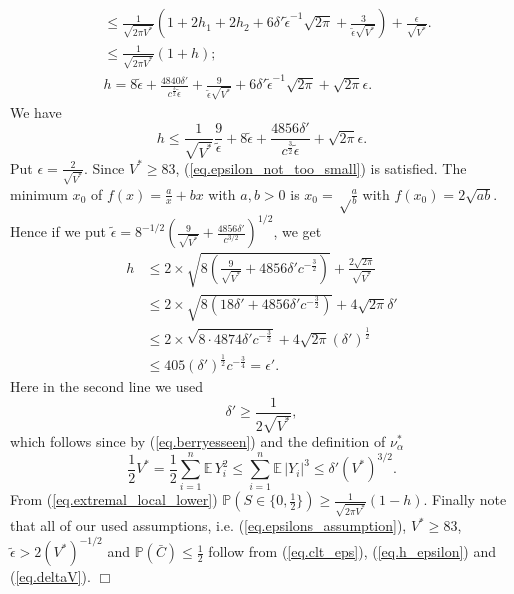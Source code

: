 \documentclass{article}
\newenvironment{proofof}[1]{\noindent {\bf Proof of #1}}{\hspace*{\fill}$\Box$}
\def\E{{\mathbb E}\,}
\newcommand{\pr}{\mathbb P}
\newcommand\nuopt[1]{\nu_{#1}^*}
\begin{document}
\begin{proofof}{Lemma~\ref{lem.clt}}
\begin{align*}
        \\ &
\le
         \frac 1 {\sqrt {2 \pi V^*}} (1 +  2h_1 + 2h_2 +   {6 \delta'} {\tilde{\epsilon}}^{-1} \sqrt {2 \pi} + \frac 3 {\tilde{\epsilon} \sqrt{V^*}} ) + \frac {\epsilon} {\sqrt{V^*}}.
        \\ &
\le
        \frac 1 {\sqrt {2 \pi V^*}} (1 + h);
        \\ &
        h=   
        8 \tilde{\epsilon} +
        \frac { 4840 \delta'} { c^{\frac 3 2} \tilde{\epsilon} } 
        + \frac {9} {\tilde{\epsilon} \sqrt{V^*}}
        +   {6 \delta'} {\tilde{\epsilon}}^{-1} \sqrt {2 \pi} +  \sqrt{2 \pi} \epsilon. 
    \end{align*}
    We have
    \[
        h \le \frac 1 {\sqrt{V^*}} \frac {9} {\tilde \epsilon} + 8 \tilde{\epsilon} + \frac {4856 \delta'} {c^{\frac 3 2} \tilde{\epsilon}}  + \sqrt{2 \pi} \epsilon.
    \]
Put $\epsilon = \frac 2 {\sqrt{V^*}}$. Since $V^* \ge 83$, (\ref{eq.epsilon_not_too_small}) is satisfied. The minimum $x_0$ of $f(x) = \frac a x + b x$ with $a,b>0$ is $x_0 = \sqrt \frac a b$ with $f(x_0)=2\sqrt {a b}$. Hence if we put $\tilde{\epsilon} = {8}^{-1/2}(\frac {9} {\sqrt{V^*}} + \frac {4856 \delta'} {c^{3/2}})^{1/2}$, we get
\begin{align}
    h & \le 2 \times \sqrt{8 \left( \frac 9 {\sqrt{V^*}} + 4856 \delta' c^{- \frac 3 2} \right)} + \frac {2 \sqrt {2 \pi}} {\sqrt{V^*}} \nonumber
    \\ & \le 2 \times \sqrt{8 \left( 18 \delta' + 4856 \delta' c^{- \frac 3 2} \right)} + 4 \sqrt {2 \pi} \delta' \nonumber
    \\ & \le 2 \times \sqrt{8 \cdot 4874 \delta' c^{- \frac 3 2}} + {4 \sqrt {2 \pi}} (\delta')^{\frac 1 2} \nonumber
    \\ & \le 405 (\delta')^{\frac 1 2} c^{-\frac 3 4} = \epsilon'. \label{eq.h_epsilon}
\end{align}
    Here in the second line we used 
    \begin{equation}
        \delta' \ge \frac 1 {2 \sqrt{V^*}}, \label{eq.deltaV}
    \end{equation}
    which follows since by (\ref{eq.berryesseen}) and the definition of $\nuopt \alpha$
    \[
        \frac 1 2 V^* = \frac 1 2 \sum_{i=1}^n \E Y_i^2 \le \sum_{i=1}^n \E |Y_i|^3 \le \delta' (V^*)^{3/2}. 
    \]
From (\ref{eq.extremal_local_lower}) $\pr(S \in \{0, \frac 1 2\}) \ge \frac 1 {\sqrt {2 \pi V^*}} (1 - h)$. 
    Finally note that all of our used assumptions, i.e. (\ref{eq.epsilons_assumption}), $V^* \ge 83$, $\tilde{\epsilon} >  2 (V^*)^{-1/2}$ and $\pr(\bar{C}) \le \frac 1 2$ follow from (\ref{eq.clt_eps}), (\ref{eq.h_epsilon}) and (\ref{eq.deltaV}). 
\end{proofof}
\end{document}
